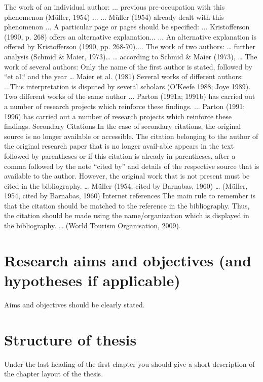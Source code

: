The work of an individual author:
... previous pre-occupation with this phenomenon (Müller, 1954) ...
... Müller (1954) already dealt with this phenomenon ...
A particular page or pages should be specified:
... Kristofferson (1990, p. 268) offers an alternative explanation...
... An alternative explanation is offered by Kristofferson (1990, pp. 268-70)....
The work of two authors:
… further analysis (Schmid \& Maier, 1973)…
… according to Schmid \& Maier (1973), …
The work of several authors:
Only the name of the first author is stated, followed by “et al.“ and the year
… Maier et al. (1981)
Several works of different authors:
...This interpretation is disputed by several scholars (O’Keefe 1988; Joye 1989).
Two different works of the same author
... Parton (1991a; 1991b) has carried out a number of research projects which reinforce these findings.
... Parton (1991; 1996) has carried out a number of research projects which reinforce these findings.
Secondary Citations
In the case of secondary citations, the original source is no longer available or accessible. The citation belonging to the author of the original research paper that is no longer avail-able appears in the text followed by parentheses or if this citation is already in parentheses, after a comma followed by the note “cited by” and details of the respective source that is available to the author. However, the original work that is not present must be cited in the bibliography.
… Müller (1954, cited by Barnabas, 1960) 
… (Müller, 1954, cited by Barnabas, 1960)
Internet references
The main rule to remember is that the citation should be matched to the reference in the bibliography. Thus, the citation should be made using the name/organization which is displayed in the bibliography.
… (World Tourism Organisation, 2009). 

\section{Research aims and objectives (and hypotheses if applicable)}
\label{sec:aims}
Aims and objectives should be clearly stated. 

\section{Structure of thesis}
\label{sec:structure}
Under the last heading of the first chapter you should give a short description of the chapter layout of the thesis.


